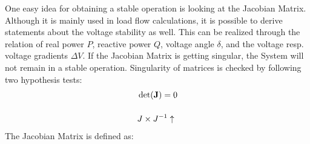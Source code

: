 One easy idea for obtaining a stable operation is looking at the Jacobian Matrix. Although it is mainly used in load flow calculations, it is possible to derive statements about the voltage stability as well. This can be realized through the relation of real power $P$, reactive power $Q$, voltage angle $\delta$, and the voltage resp. voltage gradients $\Delta V$. If the Jacobian Matrix is getting singular, the System will not remain in a stable operation. Singularity of matrices is checked by following two hypothesis tests:
\begin{align}
    &\det(\mathrm{\textbf{J}})=0 \label{eq:jacobian-det} \\[12pt]
    &J \times J^{-1} \uparrow \label{eq:jacobian-rank}
\end{align}
The Jacobian Matrix is defined as:
